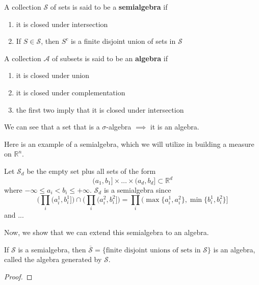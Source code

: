 \documentclass{article}
\begin{document}
    \begin{definition}
      A collection $\mathcal{S}$ of sets is said to be a \textbf{semialgebra} if 
      \begin{enumerate}
        \item it is closed under intersection 
        \item If $S \in \mathcal{S}$, then $S^c$ is a finite disjoint union of sets in $\mathcal{S}$
      \end{enumerate}
      A collection $\mathcal{A}$ of subsets is said to be an \textbf{algebra} if 
      \begin{enumerate}
        \item it is closed under union 
        \item it is closed under complementation
        \item the first two imply that it is closed under intersection
      \end{enumerate}
      We can see that a set that is a $\sigma$-algebra $\implies$ it is an algebra. 
    \end{definition}

    Here is an example of a semialgebra, which we will utilize in building a measure on $\mathbb{R}^n$.  

    \begin{example}
      Let $\mathcal{S}_d$ be the empty set plus all sets of the form 
      \begin{equation}
        (a_1, b_1] \times \ldots \times (a_d, b_d] \subset \mathbb{R}^d
      \end{equation}
      where $-\infty \leq a_i < b_i \leq +\infty$. $\mathcal{S}_d$ is a semialgebra since 
      \begin{equation}
        \bigg( \prod_i (a_i^1 , b_i^1] \bigg) \cap \bigg( \prod_i (a_i^2, b_i^2] \bigg) = \prod_i (\max\{a_i^1, a_i^2\}, \min\{b_i^1, b_i^2\}]
      \end{equation}
      and ...
    \end{example}

    Now, we show that we can extend this semialgebra to an algebra. 

    \begin{lemma}
      If $\mathcal{S}$ is a semialgebra, then $\overline{\mathcal{S}} = \{\text{finite disjoint unions of sets in } \mathcal{S}\}$ is an algebra, called the algebra generated by $\mathcal{S}$. 
    \end{lemma}
    \begin{proof}

    \end{proof}
\end{document}
